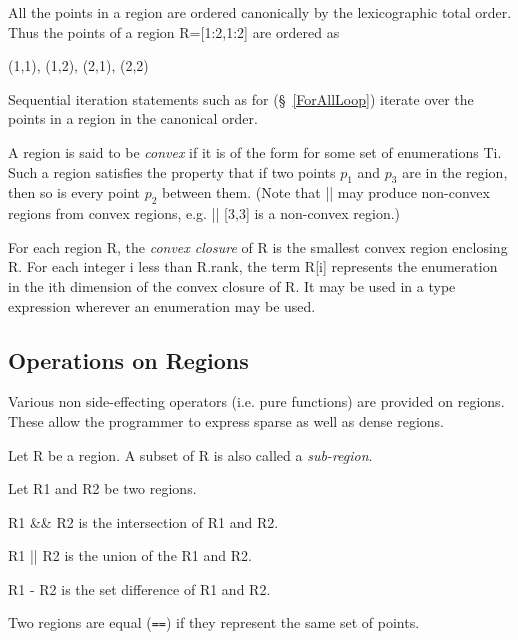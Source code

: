 All the points in a region are ordered canonically by the lexicographic total order. Thus the points of a region {\cf R=[1:2,1:2]} are ordered as 
\begin{x10}
  (1,1), (1,2), (2,1), (2,2)
\end{x10}
Sequential iteration statements such as {\cf for} (\S~\ref{ForAllLoop})
iterate over the points in a region in the canonical order.

A region is said to be {\em convex} if it is of
the form {\cf [T1,..., Tk]} for some set of enumerations {\cf Ti}. Such a
region satisfies the property that if two points $p_1$ and $p_3$ are
in the region, then so is every point $p_2$ between them. (Note that
{\cf ||} may produce non-convex regions from convex regions, e.g.{}
{\cf [1,1] || [3,3]} is a non-convex region.)

For each region {\cf R}, the {\em convex closure} of {\cf R} is the
smallest convex region enclosing {\cf R}.  For each integer {\cf i}
less than {\cf R.rank}, the term {\cf R[i]} represents the enumeration
in the {\cf i}th dimension of the convex closure of {\cf R}. It may be
used in a type expression wherever an enumeration may be used.

\subsection{Operations on Regions}
Various non side-effecting operators (i.e.{} pure functions) are
provided on regions. These allow the programmer to express sparse as
well as dense regions.

Let {\cf R} be a region. A subset of {\cf R} is also called a {\em
sub-region}.

Let {\cf R1} and {\cf R2} be two regions.

{\cf R1 \&\& R2} is the intersection of {\cf R1} and {\cf R2}.

{\cf R1 || R2} is the union of the {\cf R1} and {\cf R2}.

{\cf R1 - R2} is the set difference of {\cf R1} and {\cf R2}.

Two regions are equal ({\tt ==}) if they represent the same set of
points.











